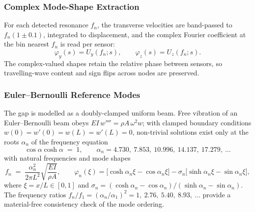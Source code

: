 \subsubsection{Complex Mode-Shape Extraction}
For each detected resonance $f_n$, the transverse velocities are band-passed
to $f_n(1 \pm 0.1)$, integrated to displacement, and the complex Fourier
coefficient at the bin nearest $f_n$ is read per sensor:
\begin{equation}
  \varphi_y(s) = U_y(f_n; s), \qquad \varphi_z(s) = U_z(f_n; s).
  \label{eq:modeshape}
\end{equation}
The complex-valued shapes retain the relative phase between sensors, so
travelling-wave content and sign flips across nodes are preserved.

\subsubsection{Euler--Bernoulli Reference Modes}
The gap is modelled as a doubly-clamped uniform beam. Free vibration of an
Euler--Bernoulli beam obeys $EI\, w'''' = \rho A\, \omega^2 w$; with clamped
boundary conditions $w(0)=w'(0)=w(L)=w'(L)=0$, non-trivial solutions exist
only at the roots $\alpha_n$ of the frequency equation
\begin{equation}
  \cos\alpha \cosh\alpha \;=\; 1,
  \qquad
  \alpha_n = 4.730,\ 7.853,\ 10.996,\ 14.137,\ 17.279,\ \dots
  \label{eq:freqequation}
\end{equation}
with natural frequencies and mode shapes
\begin{equation}
  f_n \;=\; \frac{\alpha_n^2}{2\pi L^2} \sqrt{\frac{EI}{\rho A}},
  \qquad
  \varphi_n(\xi) = \bigl[\cosh\alpha_n\xi - \cos\alpha_n\xi\bigr]
   - \sigma_n \bigl[\sinh\alpha_n\xi - \sin\alpha_n\xi\bigr],
  \label{eq:ebmodes}
\end{equation}
where $\xi = x/L \in [0,1]$ and
$\sigma_n = (\cosh\alpha_n - \cos\alpha_n)/(\sinh\alpha_n - \sin\alpha_n)$.
The frequency ratios $f_n / f_1 = (\alpha_n/\alpha_1)^2 =
1,\ 2.76,\ 5.40,\ 8.93,\ \dots$ provide a material-free consistency check of
the mode ordering.

